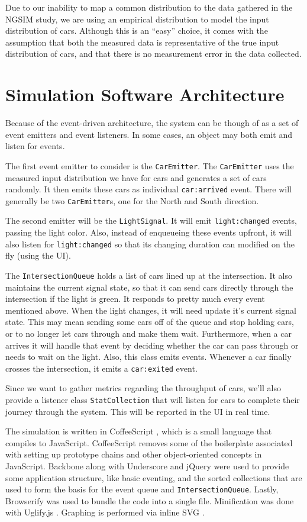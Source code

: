 \documentclass[a4paper,12pt]{article}
\begin{document}
Due to our inability to map a common distribution to the data gathered in the NGSIM study, we are using an empirical
distribution to model the input distribution of cars. Although this is an ``easy'' choice, it comes with the assumption
that both the measured data is representative of the true input distribution of cars, and that there is no measurement
error in the data collected. 

\section{Simulation Software Architecture}
Because of the event-driven architecture, the system can be though of as a set of event emitters and event listeners.
In some cases, an object may both emit and listen for events.

The first event emitter to consider is the \texttt{CarEmitter}. The \texttt{CarEmitter} uses the measured input
distribution we have for cars and generates a set of cars randomly. It then emits these cars as individual
\texttt{car:arrived} event. There will generally be two \texttt{CarEmitter}s, one for the North and South direction.

The second emitter will be the \texttt{LightSignal}. It will emit \texttt{light:changed} events, passing the light color.
Also, instead of enqueueing these events upfront, it will also listen for \texttt{light:changed} so that its
changing duration can modified on the fly (using the UI).

The \texttt{IntersectionQueue} holds a list of cars lined up at the intersection. It also maintains the
current signal state, so that it can send cars directly through the intersection if the light is green. It responds
to pretty much every event mentioned above. When the light changes, it will need update it's current signal state.
This may mean sending some cars off of the queue and stop holding cars, or to no longer let cars through and make them
wait. Furthermore, when a car arrives it will handle that event by deciding whether the car can pass through or needs
to wait on the light. Also, this class emits events. Whenever a car finally crosses the intersection, it emits
a \texttt{car:exited} event.

Since we want to gather metrics regarding the throughput of cars, we'll also provide a listener class
\texttt{StatCollection} that will listen for cars to complete their journey through the system. This will
be reported in the UI in real time.

The simulation is written in CoffeeScript \cite{coffeescript}, which is a small language that compiles to JavaScript.
CoffeeScript removes some of the boilerplate associated with setting up prototype chains and other object-oriented
concepts in JavaScript.
Backbone \cite{backbone} along with Underscore \cite{underscore} and jQuery \cite{jquery} were used to provide some
application structure, like basic eventing, and the sorted
collections that are used to form the basis for the event queue and \texttt{IntersectionQueue}. Lastly, Browserify
\cite{browserify} was used to bundle the code into a single file. Minification was done with Uglify.js \cite{uglify}.
Graphing is performed via inline SVG \cite{svg}.
\end{document}
